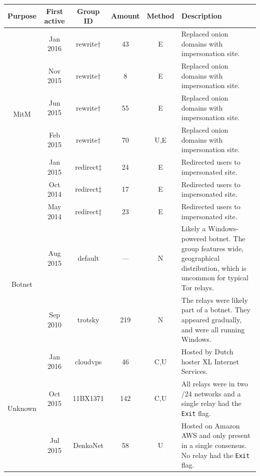 \begin{table}[ht!]
\small
\centering
\begin{tabularx}{\textwidth}{c|c c c c X}
\hline
\textbf{Purpose} & \textbf{First active} & \textbf{Group ID} & \textbf{Amount} &
\textbf{Method} & \textbf{Description} \\
\hline
\multirow{6}{*}{MitM}
& Jan 2016 & rewrite$\dagger$ & 43 & E & Replaced onion domains with
impersonation site. \\

& Nov 2015 & rewrite$\dagger$ & 8 & E & Replaced onion domains with impersonation
site. \\

& Jun 2015 & rewrite$\dagger$ & 55 & E & Replaced onion domains with
impersonation site. \\

& Feb 2015 & rewrite$\dagger$ & 70 & U,E & Replaced onion domains with
impersonation site. \\

& Jan 2015 & redirect$\ddagger$ & 24 & E & Redirected users to impersonated site.
\\

& Oct 2014 & redirect$\ddagger$ & 17 & E & Redirected users to impersonated site.
\\

& May 2014 & redirect$\ddagger$ & 23 & E & Redirected users to impersonated site.
\\

\hline

\multirow{2}{*}{Botnet}
& Aug 2015 & default & --- & N & Likely a Windows-powered botnet.  The group features
wide, geographical distribution, which is uncommon for typical Tor relays. \\

& Sep 2010 & trotsky & 219 & N & The relays were likely part of a botnet.  They
appeared gradually, and were all running Windows. \\

\hline

\multirow{5}{*}{Unknown}
& Jan 2016 & cloudvps & 46 & C,U & Hosted by Dutch hoster XL Internet Services. \\

& Oct 2015 & 11BX1371 & 142 & C,U & All relays were in two /24 networks and a single
relay had the \texttt{Exit} flag.  \\

& Jul 2015 & DenkoNet & 58 & U & Hosted on Amazon AWS and only present in a single
consensus.  No relay had the \texttt{Exit} flag. \\


\end{tabularx}
\end{table}

